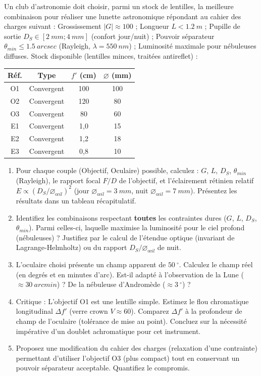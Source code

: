 \documentclass[11pt]{article}
\providecommand{\degree}{^{\circ}}
\begin{document}
\begin{exercice}
Un club d'astronomie doit choisir, parmi un stock de lentilles, la meilleure combinaison pour réaliser une lunette astronomique répondant au cahier des charges suivant : Grossissement $|G| \approx 100$ ; Longueur $L < \SI{1,2}{m}$ ; Pupille de sortie $D_S \in [\SI{2}{mm}; \SI{4}{mm}]$ (confort jour/nuit) ; Pouvoir séparateur $\theta_{min} \le \SI{1,5}{arcsec}$ (Rayleigh, $\lambda = \SI{550}{nm}$) ; Luminosité maximale pour nébuleuses diffuses.
Stock disponible (lentilles minces, traitées antireflet) :
\begin{center}
\begin{tabular}{|c|c|c|c|}
\hline
Réf. & Type & $f'$ (cm) & $\varnothing$ (mm) \\
\hline
O1 & Convergent & 100 & 100 \\
O2 & Convergent & 120 & 80 \\
O3 & Convergent & 80 & 60 \\
E1 & Convergent & 1,0 & 15 \\
E2 & Convergent & 1,2 & 18 \\
E3 & Convergent & 0,8 & 10 \\
\hline
\end{tabular}
\end{center}
\begin{enumerate}
    \item Pour chaque couple (Objectif, Oculaire) possible, calculez : $G$, $L$, $D_S$, $\theta_{min}$ (Rayleigh), le rapport focal $F/D$ de l'objectif, et l'éclairement rétinien relatif $E \propto (D_S/\varnothing_{œil})^2$ (jour $\varnothing_{œil}=\SI{3}{mm}$, nuit $\varnothing_{œil}=\SI{7}{mm}$). Présentez les résultats dans un tableau récapitulatif.
    \item Identifiez les combinaisons respectant \textbf{toutes} les contraintes dures ($G$, $L$, $D_S$, $\theta_{min}$). Parmi celles-ci, laquelle maximise la luminosité pour le ciel profond (nébuleuses) ? Justifiez par le calcul de l'étendue optique (invariant de Lagrange-Helmholtz) ou du rapport $D_S/\varnothing_{œil}$ de nuit.
    \item L'oculaire choisi présente un champ apparent de $\SI{50}{\degree}$. Calculez le champ réel (en degrés et en minutes d'arc). Est-il adapté à l'observation de la Lune ($\approx \SI{30}{arcmin}$) ? De la nébuleuse d'Andromède ($\approx \SI{3}{\degree}$) ?
    \item Critique : L'objectif O1 est une lentille simple. Estimez le flou chromatique longitudinal $\Delta f'$ (verre crown $V \approx 60$). Comparez $\Delta f'$ à la profondeur de champ de l'oculaire (tolérance de mise au point). Concluez sur la nécessité impérative d'un doublet achromatique pour cet instrument.
    \item Proposez une modification du cahier des charges (relaxation d'une contrainte) permettant d'utiliser l'objectif O3 (plus compact) tout en conservant un pouvoir séparateur acceptable. Quantifiez le compromis.
\end{enumerate}
\end{exercice}
\end{document}
